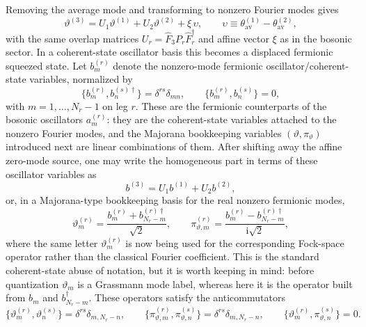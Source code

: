 \documentclass[11pt]{article}
\numberwithin{equation}{section}
\begin{document}
Removing the average mode and transforming to nonzero Fourier modes gives
\begin{equation}
\label{eq:s13-003}
\vartheta^{(3)} = U_1 \vartheta^{(1)} + U_2 \vartheta^{(2)} + \xi\,\upsilon,
\qquad
\upsilon\equiv \theta_{\mathrm{av}}^{(1)}-\theta_{\mathrm{av}}^{(2)},
\end{equation}
with the same overlap matrices $U_r=\widehat F_3P_r\widehat F_r^\dagger$ and affine vector $\xi$ as in the bosonic sector. In a coherent-state oscillator basis this becomes a displaced fermionic squeezed state. Let $b_m^{(r)}$ denote the nonzero-mode fermionic oscillator/coherent-state variables, normalized by
\begin{equation}
\label{eq:s13-004}
\{b_m^{(r)},b_n^{(s)\dagger}\}=\delta^{rs}\delta_{mn},
\qquad
\{b_m^{(r)},b_n^{(s)}\}=0,
\end{equation}
with $m=1,\dots,N_r-1$ on leg $r$. These are the fermionic counterparts of the bosonic oscillators $a_m^{(r)}$: they are the coherent-state variables attached to the nonzero Fourier modes, and the Majorana bookkeeping variables $(\vartheta,\pi_\vartheta)$ introduced next are linear combinations of them.
After shifting away the affine zero-mode source, one may write the homogeneous part in terms of these oscillator variables as
\begin{equation}
\label{eq:s13-005}
b^{(3)} = U_1 b^{(1)} + U_2 b^{(2)},
\end{equation}
or, in a Majorana-type bookkeeping basis for the real nonzero fermionic modes,
\begin{equation}
\label{eq:s13-006}
\vartheta_m^{(r)}=\frac{b_m^{(r)}+b_{N_r-m}^{(r)\dagger}}{\sqrt2},
\qquad
\pi_{\vartheta,m}^{(r)}=\frac{b_m^{(r)}-b_{N_r-m}^{(r)\dagger}}{\mathrm{i}\sqrt2},
\end{equation}
where the same letter $\vartheta_m^{(r)}$ is now being used for the corresponding Fock-space operator rather than the classical Fourier coefficient. This is the standard coherent-state abuse of notation, but it is worth keeping in mind: before quantization $\vartheta_m$ is a Grassmann mode label, whereas here it is the operator built from $b_m$ and $b_{N_r-m}^\dagger$.
These operators satisfy the anticommutators
\begin{equation}
\label{eq:s13-007}
\bigl\{\vartheta_m^{(r)},\vartheta_n^{(s)}\bigr\}
=
\delta^{rs}\delta_{m,N_r-n},
\qquad
\bigl\{\pi_{\vartheta,m}^{(r)},\pi_{\vartheta,n}^{(s)}\bigr\}
=
\delta^{rs}\delta_{m,N_r-n},
\qquad
\bigl\{\vartheta_m^{(r)},\pi_{\vartheta,n}^{(s)}\bigr\}=0.
\end{equation}
\end{document}
